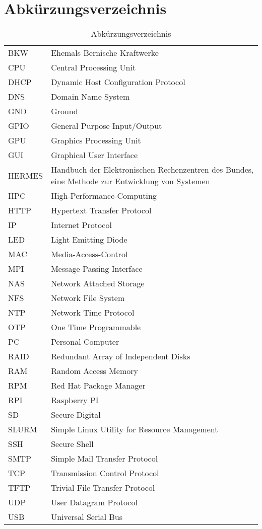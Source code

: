 \section{Abkürzungsverzeichnis}

\begin{table}[H]
\centering
\label{my-label}
\begin{tabular}{p{2cm}p{14cm}}
BKW & Ehemals Bernische Kraftwerke \\
CPU & Central Processing Unit \\
DHCP & Dynamic Host Configuration Protocol \\
DNS & Domain Name System \\
GND & Ground \\
GPIO & General Purpose Input/Output \\
GPU & Graphics Processing Unit \\
GUI & Graphical User Interface \\
HERMES & Handbuch der Elektronischen Rechenzentren des Bundes, eine Methode zur Entwicklung von Systemen \\
HPC & High-Performance-Computing \\
HTTP & Hypertext Transfer Protocol \\
IP & Internet Protocol \\
LED & Light Emitting Diode \\
MAC & Media-Access-Control \\
MPI & Message Passing Interface \\
NAS & Network Attached Storage  \\
NFS & Network File System \\
NTP & Network Time Protocol \\
OTP & One Time Programmable \\
PC & Personal Computer \\
RAID & Redundant Array of Independent Disks \\
RAM & Random Access Memory \\
RPM & Red Hat Package Manager \\
RPI & Raspberry PI \\
SD & Secure Digital \\
SLURM & Simple Linux Utility for Resource Management \\
SSH & Secure Shell  \\
SMTP & Simple Mail Transfer Protocol \\
TCP & Transmission Control Protocol \\
TFTP & Trivial File Transfer Protocol \\
UDP & User Datagram Protocol \\
USB & Universal Serial Bus \\
\end{tabular}
\caption{Abkürzungsverzeichnis}
\end{table}
